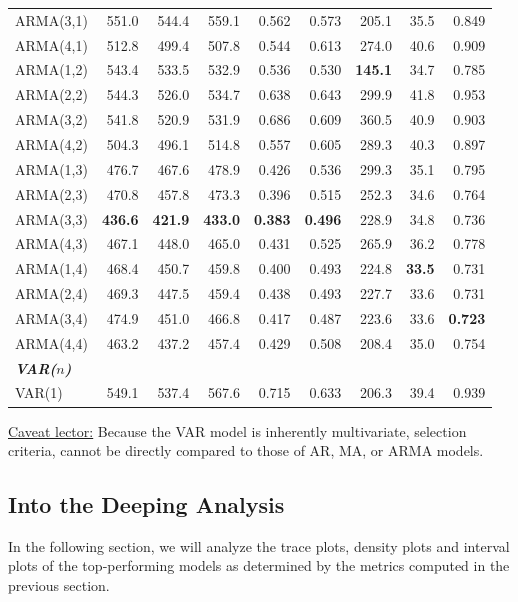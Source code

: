 \documentclass{Configuration_Files/PoliMi3i_thesis}
\begin{document}
\begin{table}[H]
\begin{tabular}{@{}lrrrrrrrr@{}}
    ARMA(3,1) & 551.0 & 544.4 & 559.1 & 0.562 & 0.573 & 205.1 & 35.5 & 0.849 \\
    ARMA(4,1) & 512.8 & 499.4 & 507.8 & 0.544 & 0.613 & 274.0 & 40.6 & 0.909 \\
    ARMA(1,2) & 543.4 & 533.5 & 532.9 & 0.536 & 0.530 & \textbf{145.1} & 34.7 & 0.785 \\
    ARMA(2,2) & 544.3 & 526.0 & 534.7 & 0.638 & 0.643 & 299.9 & 41.8 & 0.953 \\
    ARMA(3,2) & 541.8 & 520.9 & 531.9 & 0.686 & 0.609 & 360.5 & 40.9 & 0.903 \\
    ARMA(4,2) & 504.3 & 496.1 & 514.8 & 0.557 & 0.605 & 289.3 & 40.3 & 0.897 \\
    ARMA(1,3) & 476.7 & 467.6 & 478.9 & 0.426 & 0.536 & 299.3 & 35.1 & 0.795 \\
    ARMA(2,3) & 470.8 & 457.8 & 473.3 & 0.396 & 0.515 & 252.3 & 34.6 & 0.764 \\
    \rowcolor{gray!20}
    ARMA(3,3) & \textbf{436.6} & \textbf{421.9} & \textbf{433.0} 
           & \textbf{0.383} & \textbf{0.496} & 228.9 & 34.8 & 0.736 \\
    ARMA(4,3) & 467.1 & 448.0 & 465.0 & 0.431 & 0.525 & 265.9 & 36.2 & 0.778 \\
    ARMA(1,4) & 468.4 & 450.7 & 459.8 & 0.400 & 0.493 & 224.8 & \textbf{33.5} & 0.731 \\
    ARMA(2,4) & 469.3 & 447.5 & 459.4 & 0.438 & 0.493 & 227.7 & 33.6 & 0.731 \\
    ARMA(3,4) & 474.9 & 451.0 & 466.8 & 0.417 & 0.487 & 223.6 & 33.6 & \textbf{0.723} \\
    ARMA(4,4) & 463.2 & 437.2 & 457.4 & 0.429 & 0.508 & 208.4  & 35.0 & 0.754 \\
    \midrule
    \midrule
\textbf{\textit{VAR($n$)}}\\    VAR(1)
      & 549.1 & 537.4 & 567.6 & 0.715 & 0.633 & 206.3 & 39.4 & 0.939 \\
    \bottomrule
  \end{tabular}
\end{table}
\label{CPI_TABLE}

\underline{Caveat lector:} Because the VAR model is inherently multivariate, selection criteria, cannot be directly compared to those of AR, MA, or ARMA models. 

\newpage
\subsection{Into the Deeping Analysis}
In the following section, we will analyze the trace plots, density plots and interval plots of the top‐performing models as determined by the metrics computed in the previous section.
\end{document}
